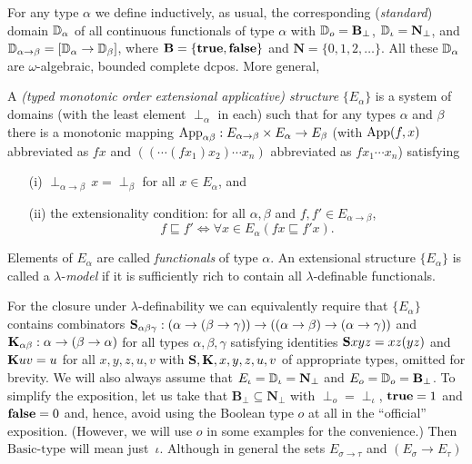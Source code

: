 \documentclass[fleqn]{LMCS}
\theoremstyle{plain}\newtheorem{satz}[thm]{Satz}
\theoremstyle{plain}\newtheorem{hyp}[thm]{Hypothesis}
\theoremstyle{plain}\newtheorem{hyps}[thm]{Hypotheses}
\theoremstyle{definition}\newtheorem{note}[thm]{Note}
\newcommand{\setof}[1]{\{#1\}}
\newcommand{\App}{{\rm App}}
\newcommand{\arr}{\rightarrow}
\newcommand{\NN}{\mathbf{N}}
\newcommand{\BB}{\mathbf{B}}
\newcommand{\K}{\mbox{\bf K}}
\newcommand{\Ss}{\mbox{\bf S}}
\newcommand{\Undef}{{\perp}}
\newcommand{\sqle}{\sqsubseteq}
\newcommand{\?}{\mbox{?}}
\newcommand{\false}{\mbox{\bf false}}
\newcommand{\true}{\mbox{\bf true}}
\begin{document}
For any type $\alpha$ we define inductively, as usual, 
the corresponding (\emph{standard}) domain $\mathbb{D}_{\alpha}$ of
all {continuous} functionals of type $\alpha$ 
with $\bbD_o=\BB_{\Undef}$, $\bbD_\iota=\NN_{\Undef}$, 
and $\bbD_{\alpha\arr\beta}=[\bbD_{\alpha}\arr \bbD_{\beta}]$,
where $\BB=\setof{\true,\false}$ and 
$\NN=\setof{0,1,2,\ldots}$. 
All these $\mathbb{D}_\alpha$ are $\omega$-algebraic, bounded complete dcpos. 
More general, 
\begin{defi}A \emph{(typed monotonic order extensional 
applicative) structure} $\setof{E_{\alpha}}$ is a system of domains 
(with the least element $\Undef_{\alpha}$ in each) such that 
for any types $\alpha$ and $\beta$ there is a monotonic 
mapping 
$\App_{\alpha\beta}:E_{\alpha\arr\beta}\times E_{\alpha}\arr 
E_{\beta}$ (with 
$\App(f,x)$ abbreviated as $fx$ and 
$((\cdots(fx_1)x_2)\cdots x_n)$ abbreviated as $fx_1\cdots x_n$) 
satisfying 
\begin{itemize}
\item[(i)] $\Undef_{\alpha\arr\beta}\,x=\Undef_{\beta}$ for all 
$x\in E_\alpha$, and 
\item[(ii)]the extensionality condition: for all $\alpha,\beta$ and 
$f,f'\in E_{\alpha\arr\beta}$,
\[
f\sqle f'\iff \forall x\in E_{\alpha}(fx\sqle f'x).
\]
\end{itemize}
Elements of $E_{\alpha}$ 
are called \emph{functionals} of type $\alpha$.
An extensional structure $\setof{E_{\alpha}}$ is called a $\lambda$-\emph{model} 
if it is sufficiently rich to contain all 
$\lambda$-definable functionals. 
\end{defi}
For the closure under $\lambda$-definability we can equivalently require that 
$\setof{E_{\alpha}}$ contains combinators 
$\Ss_{\alpha\beta\gamma}:
(\alpha\arr(\beta\arr\gamma))\arr((\alpha\arr\beta)\arr(\alpha\arr\gamma))
$ and 
$\K_{\alpha\beta}:\alpha\arr(\beta\arr\alpha)$
for all types $\alpha,\beta,\gamma$ satisfying identities 
$\Ss xyz=xz(yz)$ and $\K uv=u$ for all $x,y,z,u,v$ 
with $\Ss,\K,x,y,z,u,v$ of appropriate types, omitted for brevity. 
We will also always assume that 
$E_{\iota}=\bbD_{\iota}=\NN_\Undef$ and $E_{o}=\bbD_{o}=\BB_\Undef$. 
To simplify the exposition, let us take that 
$\BB_\Undef\subseteq \NN_\Undef$ 
with $\Undef_o=\Undef_\iota$, $\true=1$ and $\false=0$ 
and, hence, avoid using the Boolean type $o$ at all in the ``official'' exposition. 
(However, we will use $o$ in some examples for the convenience.)
Then $\mbox{Basic-type}$ will mean just~$\iota$. 
Although in general the sets $E_{\sigma\arr\tau}$ and $(E_\sigma\arr E_\tau)$
\end{document}
